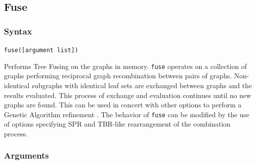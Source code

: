 \subsection{Fuse}
	\subsubsection{Syntax}
		\texttt{fuse([argument list])}
		
	\begin{phygdescription}
		{Performs Tree Fusing \citep{goloboff1999, moilanen1999, moilanen2001} on the graphs
		in memory. \texttt{fuse} operates on a collection of graphs performing reciprocal graph 
		recombination between pairs of graphs. Non-identical subgraphs with identical leaf sets 
		are exchanged between graphs and the results evaluated. This process of exchange 
		and evaluation continues until no new graphs are found. This can be used in concert 
		with other options to perform a Genetic Algorithm refinement \citep{Holland1975}. The 
		behavior of \texttt{fuse} can be modified by the use of options specifying SPR and 
		TBR-like rearrangement of the combination process.}
	\end{phygdescription}
	
	\subsubsection{Arguments}
	
